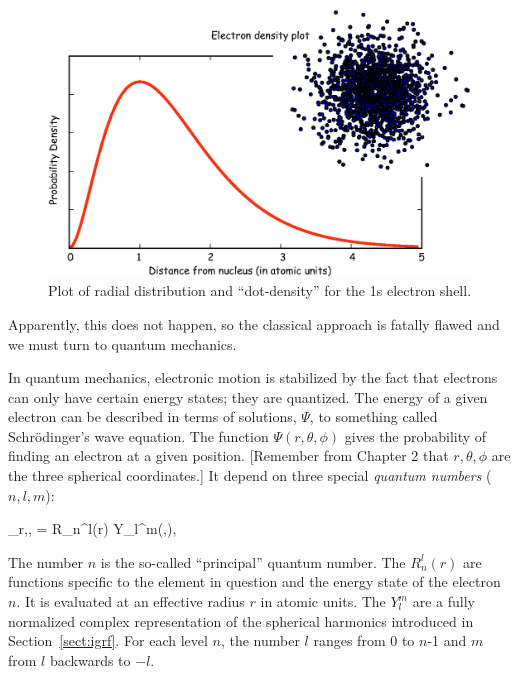 {\begin{figure}[htb]
\centering  \includegraphics[width=10 cm]{EPSfiles/1s.eps}
\caption{Plot of radial distribution and ``dot-density'' for the 1s electron shell.}
\label{fig:1s}
\end{figure}

\noindent 
 Apparently, this  does not happen, so the classical approach is fatally flawed and we must turn to quantum mechanics.   


In quantum mechanics,  electronic motion is stabilized  by the fact that electrons can only have certain energy states; they are quantized.   The energy of a given electron can be  described in terms of solutions, $\Psi$, to  something called  
Schr\"odinger's 
wave equation. The function $\Psi(r,\theta,\phi)$ gives the probability  of finding an electron at a given position.   [Remember from Chapter  2 that $r,\theta,\phi$ are the three spherical coordinates.]    It depend on three special
{\it quantum numbers} ($n,l,m$):

\beq
\Psi_{r,\theta,\phi} = R_n^l(r) Y_l^m(\phi,\theta),
\label{eq:wave}
\eeq

\noindent The number $n$ is the so-called ``principal'' quantum number. The $R_n^l(r)$ are functions specific to the element in question and the energy state of the electron $n$.  It is evaluated at an   effective radius $r$ in atomic units.  The $Y_l^m$ are a fully normalized complex representation of the spherical harmonics introduced in Section~\ref{sect:igrf}.     
For each level $n$, the  number $l$ ranges from 0 to $n$-1 and  $m$ from $l$ backwards to $-l$.  

}
